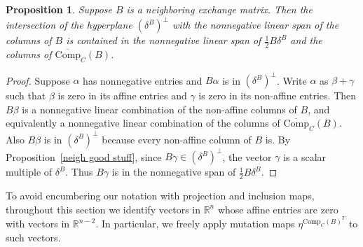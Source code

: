 \documentclass{amsart}
\newtheorem{proposition}{Proposition}[section]
\theoremstyle{definition}
\theoremstyle{remark}
\numberwithin{equation}{section}
\newcommand{\reals}{\mathbb R}
\newcommand{\0}{{\mathbf{0}}}
\newcommand{\Comp}{\mathrm{Comp}_C}
\newcommand{\CompPlus}{\overline{\mathrm{Comp}}_C}
\begin{document}
\begin{proposition}\label{Comp span}
Suppose $B$ is a neighboring exchange matrix.
Then the intersection of the hyperplane $(\delta^B)^\perp$ with the nonnegative linear span of the columns of $B$ is contained in the nonnegative linear span of $\frac12B\delta^B$ and the columns of $\CompPlus(B)$.
\end{proposition}
\begin{proof}
Suppose $\alpha$ has nonnegative entries and $B\alpha$ is in $(\delta^B)^\perp$.
Write $\alpha$ as $\beta+\gamma$ such that $\beta$ is zero in its affine entries and $\gamma$ is zero in its non-affine entries.
Then $B\beta$ is a nonnegative linear combination of the non-affine columns of $B$, and equivalently a nonnegative linear combination of the columns of $\CompPlus(B)$.
Also $B\beta$ is in $(\delta^B)^\perp$ because every non-affine column of $B$ is.
By Proposition~\ref{neigh good stuff}, since $B\gamma\in(\delta^B)^\perp$, the vector $\gamma$ is a scalar multiple of $\delta^B$.
Thus $B\gamma$ is in the nonnegative span of $\frac12B\delta^B$.
\end{proof}

To avoid encumbering our notation with projection and inclusion maps, throughout this section we identify vectors in $\reals^n$ whose affine entries are zero with vectors in $\reals^{n-2}$.
In particular, we freely apply mutation maps $\eta^{\Comp(B)^T}$ to such vectors.
\end{document}
